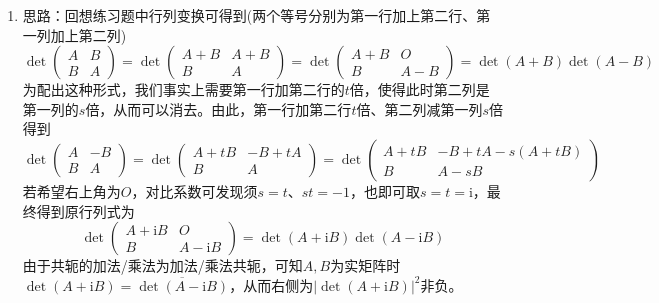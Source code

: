 \documentclass[a4paper,UTF8,fontset=windows]{ctexart}
\newcommand*{\ir}{\mathrm{i}}
\newcommand*{\note}{\noindent *}
\begin{document}
\begin{enumerate}
\begin{enumerate}
        \item

        \note 思路：回想练习题中行列变换可得到(两个等号分别为第一行加上第二行、第一列加上第二列)
        $$\det\begin{pmatrix}A&B\\B&A\end{pmatrix}=\det\begin{pmatrix}A+B&A+B\\B&A\end{pmatrix}=\det\begin{pmatrix}A+B&O\\B&A-B\end{pmatrix}=\det(A+B)\det(A-B)$$
        为配出这种形式，我们事实上需要第一行加第二行的$t$倍，使得此时第二列是第一列的$s$倍，从而可以消去。由此，第一行加第二行$t$倍、第二列减第一列$s$倍得到
        $$\det\begin{pmatrix}A&-B\\B&A\end{pmatrix}=\det\begin{pmatrix}A+tB&-B+tA\\B&A\end{pmatrix}=\det\begin{pmatrix}A+tB&-B+tA-s(A+tB)\\B&A-sB\end{pmatrix}$$
        若希望右上角为$O$，对比系数可发现须$s=t$、$st=-1$，也即可取$s=t=\ir$，最终得到原行列式为
        $$\det\begin{pmatrix}A+\ir B&O\\B&A-\ir B\end{pmatrix}=\det(A+\ir B)\det(A-\ir B)$$
        由于共轭的加法/乘法为加法/乘法共轭，可知$A,B$为实矩阵时$\det(A+\ir B)=\overline{\det(A-\ir B)}$，从而右侧为$|\det(A+\ir B)|^2$非负。


\end{enumerate}
\end{enumerate}
\end{document}
